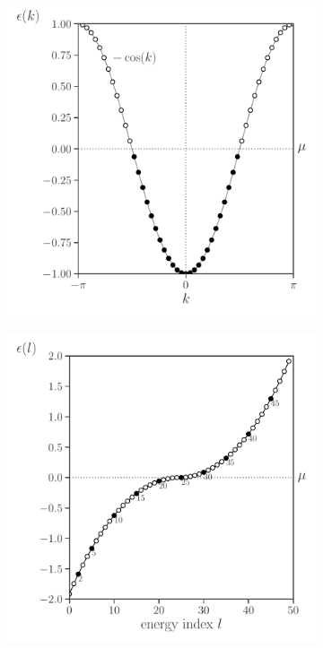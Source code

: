 \documentclass[11pt, a4paper, oneside]{book}
\theoremstyle{definition} %
\begin{document}
\begin{figure}[h]
\centering
\begin{subfigure}[t]{0.49\textwidth}
	\centering
	\includegraphics[width =\textwidth]{dispersionrelationH0}
\end{subfigure}
\begin{subfigure}[t]{0.49\textwidth}
	\centering
	\includegraphics[width =\textwidth]{dispersionrelationSSD}

\end{subfigure}
\end{figure}
\end{document}
